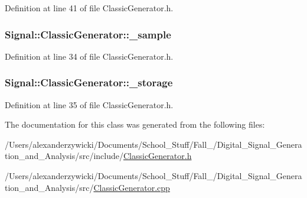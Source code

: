 Definition at line 41 of file Classic\+Generator.\+h.

\hypertarget{classSignal_1_1ClassicGenerator_a40313d0d806d6e44af7d41b3ef3a0822}{
\subsubsection[{\+\_\+sample}]{ Signal\+::\+Classic\+Generator\+::\+\_\+sample\hspace{0.3cm}{\ttfamily [protected]}}}\label{classSignal_1_1ClassicGenerator_a40313d0d806d6e44af7d41b3ef3a0822}


Definition at line 34 of file Classic\+Generator.\+h.

\hypertarget{classSignal_1_1ClassicGenerator_a1214faf589eccb01631700723900bbf9}{
\subsubsection[{\+\_\+storage}]{ Signal\+::\+Classic\+Generator\+::\+\_\+storage\hspace{0.3cm}{\ttfamily [protected]}}}\label{classSignal_1_1ClassicGenerator_a1214faf589eccb01631700723900bbf9}


Definition at line 35 of file Classic\+Generator.\+h.



The documentation for this class was generated from the following files\+:\begin{DoxyCompactItemize}
\item 
/\+Users/alexanderzywicki/\+Documents/\+School\+\_\+\+Stuff/\+Fall\+\_/\+Digital\+\_\+\+Signal\+\_\+\+Generation\+\_\+and\+\_\+\+Analysis/src/include/\hyperlink{ClassicGenerator_8h}{Classic\+Generator.\+h}\item 
/\+Users/alexanderzywicki/\+Documents/\+School\+\_\+\+Stuff/\+Fall\+\_/\+Digital\+\_\+\+Signal\+\_\+\+Generation\+\_\+and\+\_\+\+Analysis/src/\hyperlink{ClassicGenerator_8cpp}{Classic\+Generator.\+cpp}\end{DoxyCompactItemize}
